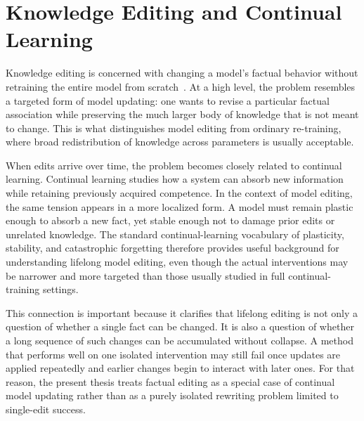 \section{Knowledge Editing and Continual Learning}

Knowledge editing is concerned with changing a model's factual behavior without retraining the entire model from scratch~\cite{wang2024knowledge,yao2023editing}. At a high level, the problem resembles a targeted form of model updating: one wants to revise a particular factual association while preserving the much larger body of knowledge that is not meant to change. This is what distinguishes model editing from ordinary re-training, where broad redistribution of knowledge across parameters is usually acceptable.

When edits arrive over time, the problem becomes closely related to continual learning. Continual learning studies how a system can absorb new information while retaining previously acquired competence. In the context of model editing, the same tension appears in a more localized form. A model must remain plastic enough to absorb a new fact, yet stable enough not to damage prior edits or unrelated knowledge. The standard continual-learning vocabulary of plasticity, stability, and catastrophic forgetting therefore provides useful background for understanding lifelong model editing, even though the actual interventions may be narrower and more targeted than those usually studied in full continual-training settings.

This connection is important because it clarifies that lifelong editing is not only a question of whether a single fact can be changed. It is also a question of whether a long sequence of such changes can be accumulated without collapse. A method that performs well on one isolated intervention may still fail once updates are applied repeatedly and earlier changes begin to interact with later ones. For that reason, the present thesis treats factual editing as a special case of continual model updating rather than as a purely isolated rewriting problem limited to single-edit success.
